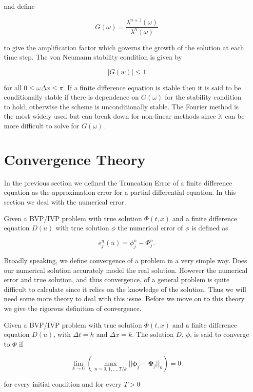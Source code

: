 \documentclass[../main.tex]{subfiles}
\begin{document}
  and define

  \begin{equation}
    G(\omega) = \frac{\lambda^{n+1}(\omega)}{\lambda^n(\omega)}
  \end{equation}

  to give the amplification factor which governs the growth of the solution at each time step. The von Neumann stability condition is given by

  \begin{equation}
    \left\vert G(w) \right\vert \leq 1
  \end{equation}

  for all $0 \leq \omega \Delta x \leq \pi$. If a finite difference equation is stable then it is said to be conditionally stable if there is dependence on $G(\omega)$ for the stability condition to hold, otherwise the scheme is unconditionally stable. The Fourier method is the most widely used but can break down for non-linear methods since it can be more difficult to solve for $G(\omega)$.

  \section{Convergence Theory}
  In the previous section we defined the Truncation Error of a finite difference equation as the approximation error for a partial differential equation. In this section we deal with the numerical error.

  \begin{definition}
    Given a BVP/IVP problem with true solution $\Phi(t, x)$ and a finite difference equation $D(u)$ with true solution $\phi$ the numerical error of $\phi$ is defined as

    \begin{equation}
      e^n_j(u) = \phi^n_j - \Phi^n_j.
    \end{equation}
  \end{definition}

  Broadly speaking, we define convergence of a problem in a very simple way. Does our numerical solution accurately model the real solution. However the numerical error and true solution, and thus convergence, of a general problem is quite difficult to calculate since it relies on the knowledge of the solution. Thus we will need some more theory to deal with this issue. Before we move on to this theory we give the rigorous definition of convergence.

  \begin{definition}[Convergence]
    Given a BVP/IVP problem with true solution $\Phi(t, x)$ and a finite difference equation $D(u)$, with $\Delta t = h$ and $\Delta x = k$. The solution $D$, $\phi$, is said to converge to $\Phi$ if

    \begin{equation}
      \lim_{k \to 0} \left( \max_{n = 0, 1, ..., T / k} || \boldsymbol\phi_j - \boldsymbol\Phi_j ||_k \right) = 0.
    \end{equation}

    for every initial condition and for every $T > 0$
  \end{definition}
\end{document}
